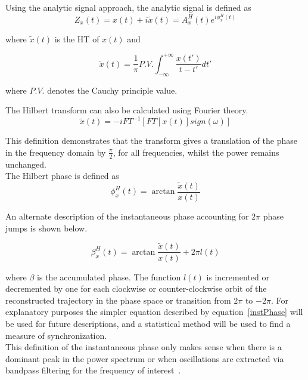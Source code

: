 \documentclass[]{article}
\begin{document}
Using the analytic signal approach, the analytic signal is defined
as
\begin{equation}
Z_x(t) = x(t) + i\tilde{x}(t) = A_x^H(t)e^{i\phi_x^H(t)}
\end{equation}

where $\tilde{x}(t)$ is the HT of $x(t)$ and

\begin{equation}
\tilde{x}(t) =
\frac{1}{\pi}P.V.\int_{-\infty}^{+\infty}\frac{x(t')}{t-t'}dt'
\end{equation}

where $P.V.$ denotes the Cauchy principle value.

The Hilbert transform can also be calculated using Fourier theory.
\begin{equation}
\tilde{x}(t) = -iFT^{-1}[FT[x(t)]sign(\omega)]
\end{equation}

This definition demonstrates that the transform gives a translation
of the phase in the frequency domain by $\frac{\pi}{2}$, for all
frequencies, whilst the power remains unchanged.\\

The Hilbert phase is defined as
\begin{equation}
\phi_x^{H}(t) = \arctan\frac{\tilde{x}(t)}{x(t)}
\label{instPhase}
\end{equation}

An alternate description of the instantaneous phase accounting for
$2\pi$ phase jumps is shown below.

\begin{equation}
\beta_x^{H}(t) = \arctan\frac{\tilde{x}(t)}{x(t)}+2\pi l(t)
\end{equation}

where $\beta$ is the accumulated phase. The function $l(t)$ is
incremented or decremented by one for each clockwise or
counter-clockwise orbit of the reconstructed trajectory in the phase
space or transition from $2\pi$ to $-2\pi$. For explanatory purposes
the simpler equation described by equation~\ref{instPhase} will be
used for future descriptions, and a statistical method will be used
to find
a measure of synchronization.\\

This definition of the instantaneous phase only makes sense when
there is a dominant peak in the power spectrum or when oscillations
are extracted via bandpass
filtering for the frequency of interest~\cite{Rosenblum2004}.\\
\end{document}
